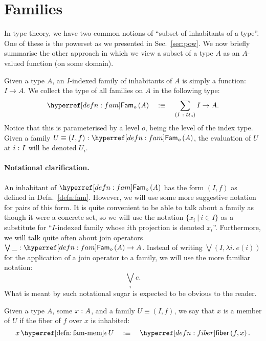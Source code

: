 \section{Families}\label{sec:fam}

In type theory, we have two common notions of ``subset of inhabitants of a type''. One of
these is the powerset as we presented in Sec.~\ref{sec:pow}. We now briefly summarise the
other approach in which we view a subset of a type $A$ as an $A$-valued function (on some
domain).

\begin{defn}[Family]\label{defn:fam}
  Given a type $A$, an $I$-indexed family of inhabitants of $A$ is simply a function:
  $I \rightarrow A$. We collect the type of all families on $A$ in the following type:
  \begin{equation*}
    \sub{o}{A} \quad\is\quad \sigmaty{I}{\univ{}_o}{I \rightarrow A}.
  \end{equation*}
  Notice that this is parameterised by a level $o$, being the level of the index type.
  Given a family $\oftyI{U \equiv (I, f)}{\sub{o}{A}}$, the evaluation of $U$ at $i\hspace{0.1mm}:\hspace{0.1mm}I$
  will be denoted $U_i$.
\end{defn}

\paragraph*{Notational clarification.} An inhabitant of $\sub{o}{A}$ has the form
$(I, f)$ as defined in Defn.~\ref{defn:fam}. However, we will use some more suggestive
notation for pairs of this form. It is quite convenient to be able to talk about a family
as though it were a concrete set, so we will use the notation $\{ x_i ~|~ i \in I \}$ as a
substitute for ``$I$-indexed family whose $i$th projection is denoted $x_i$''. Furthermore,
we will talk quite often about join operators $\oftyI{\bigvee\_}{\sub{o}{A} \rightarrow A}$. Instead of
writing $\bigvee (I, \lambda i.~e(i))$ for the application of a join operator to a family, we will
use the more familiar notation:
\begin{equation}\label{eqn:join-syntax}
  \bigvee_i e.
\end{equation}
What is meant by such notational sugar is expected to be obvious to the reader.

\begin{defn}\label{defn:fam-mem}
  Given a type $A$, some $x\hspace{0.1mm}:\hspace{0.1mm}A$, and a family $U \equiv (I, f)$, we say
  that $x$ is a member of $U$ if the fiber of $f$ over $x$ is inhabited:
  \begin{equation*}
    \memfam{x}{U} \quad\is\quad \fiber{f}{x}.
  \end{equation*}
\end{defn}

